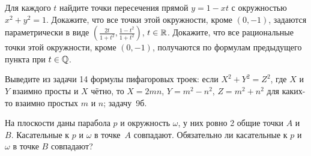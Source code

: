 \documentclass[a4paper, 11pt]{article}
\begin{document}
\vspace*{-2.1cm}
\vspace*{17mm}


 Для каждого $t$ найдите точки пересечения прямой $y=1-xt$ с окружностью $x^2+y^2=1$.
 Докажите, что все точки этой окружности, кроме $(0,-1)$, задаются параметрически в виде $\left(\frac{2t}{1+t^2},\frac{1-t^2}{1+t^2}\right)$, $t\in\mathbb{R}$.
 Докажите, что все рациональные точки этой окружности, кроме $(0,-1)$,  получаются по формулам предыдущего пункта при $t\in\mathbb{Q}$.


Выведите из задачи 14  формулы пифагоровых троек: если $X^2+Y^2=Z^2$, где $X$ и  $Y$ взаимно просты и $X$ чётно, то $X=2mn$, $Y=m^2-n^2$, $Z=m^2+n^2$ для каких-то взаимно простых $m$ и $n$;  задачу~9б.


На плоскости даны парабола $p$ и окружность $\omega$, у них ровно 2
общие точки $A$ и $B$. Касательные к $p$ и $\omega$
в точке~$A$ совпадают. Обязательно ли касательные
к  $p$ и $\omega$  в точке $B$ совпадают?


\end{document}
